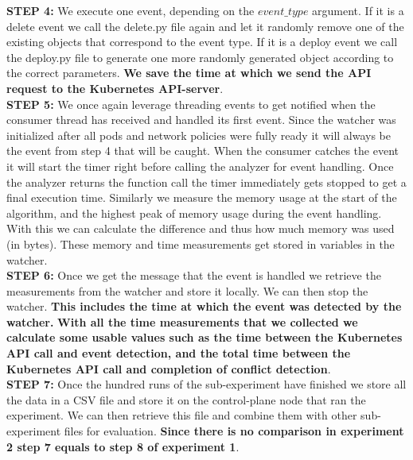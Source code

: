 \textbf{STEP 4:} We execute one event, depending on the $event\_type$ argument. If it is a delete event we call the delete.py file again and let it randomly remove one of the existing objects that correspond to the event type. If it is a deploy event we call the deploy.py file to generate one more randomly generated object according to the correct parameters. \textbf{We save the time at which we send the API request to the Kubernetes API-server}.
\\[10pt]

\textbf{STEP 5:} We once again leverage threading events to get notified when the consumer thread has received and handled its first event. Since the watcher was initialized after all pods and network policies were fully ready it will always be the event from step 4 that will be caught. When the consumer catches the event it will start the timer right before calling the analyzer for event handling. Once the analyzer returns the function call the timer immediately gets stopped to get a final execution time. Similarly we measure the memory usage at the start of the algorithm, and the highest peak of memory usage during the event handling. With this we can calculate the difference and thus how much memory was used (in bytes). These memory and time measurements get stored in variables in the watcher.
\\[10pt]

\textbf{STEP 6:} Once we get the message that the event is handled we retrieve the measurements from the watcher and store it locally. We can then stop the watcher. 
\textbf{This includes the time at which the event was detected by the watcher.} \textbf{With all the time measurements that we collected we calculate some usable values such as the time between the Kubernetes API call and event detection, and the total time between the Kubernetes API call and completion of conflict detection}.
\\[10pt]

\textbf{STEP 7:} Once the hundred runs of the sub-experiment have finished we store all the data in a CSV file and store it on the control-plane node that ran the experiment. We can then retrieve this file and combine them with other sub-experiment files for evaluation.  \textbf{Since there is no comparison in experiment 2 step 7 equals to step 8 of experiment 1}. 
\\[10pt]


